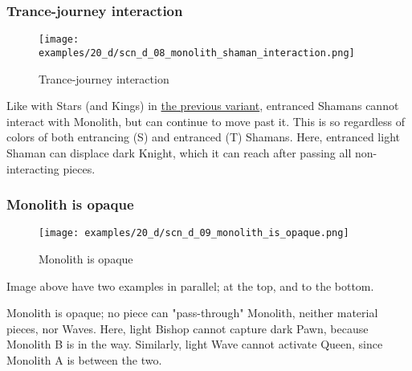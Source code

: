 \subsubsection*{Trance-journey interaction}
\label{sec:Discovery/Monolith/Teleporting/Trance-journey interaction}

\vspace*{-1.4\baselineskip}
\noindent
\begin{figure}[!h]
\texttt{[image: examples/20\_d/scn\_d\_08\_monolith\_shaman\_interaction.png]}
\vspace*{-1.3\baselineskip}
\caption{Trance-journey interaction}
\label{fig:scn_d_08_monolith_shaman_interaction}
\end{figure}

\vspace*{-0.4\baselineskip}
Like with Stars (and Kings) in
\hyperref[fig:scn_cot_21_light_light_shaman_interaction_start]{the previous variant},
entranced Shamans cannot interact with Monolith, but can continue to move past it.
This is so regardless of colors of both entrancing (S) and entranced (T) Shamans.
Here, entranced light Shaman can displace dark Knight, which it can reach after
passing all non-interacting pieces.

\clearpage %

\subsubsection*{Monolith is opaque}
\label{sec:Discovery/Monolith/Movement/Monolith is opaque}

\vspace*{-1.4\baselineskip}
\noindent
\begin{figure}[!h]
\texttt{[image: examples/20\_d/scn\_d\_09\_monolith\_is\_opaque.png]}
\vspace*{-1.3\baselineskip}
\caption{Monolith is opaque}
\label{fig:scn_d_09_monolith_is_opaque}
\end{figure}

\vspace*{-0.4\baselineskip}
Image above have two examples in parallel; at the top, and to the bottom.

Monolith is opaque; no piece can "pass-through" Monolith, neither material pieces,
nor Waves. Here, light Bishop cannot capture dark Pawn, because Monolith B is in
the way. Similarly, light Wave cannot activate Queen, since Monolith A is between
the two.

